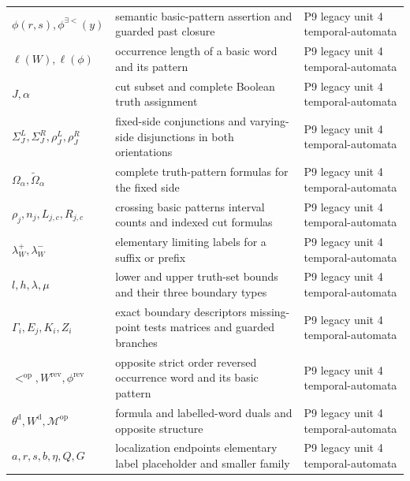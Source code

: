 \begin{longtable}{@{}p{}p{}p{}@{}}
\(\phi(r,\allowbreak s),\allowbreak \phi^{\exists<}(y)\) & semantic basic-pattern assertion and guarded past closure & P9 legacy unit 4 temporal-\allowbreak{}automata \\
\(\ell(W),\allowbreak \ell(\phi)\) & occurrence length of a basic word and its pattern & P9 legacy unit 4 temporal-\allowbreak{}automata \\
\(J,\allowbreak \alpha\) & cut subset and complete Boolean truth assignment & P9 legacy unit 4 temporal-\allowbreak{}automata \\
\(\Sigma_J^L,\allowbreak \Sigma_J^R,\allowbreak \rho_J^L,\allowbreak \rho_J^R\) & fixed-side conjunctions and varying-side disjunctions in both orientations & P9 legacy unit 4 temporal-\allowbreak{}automata \\
\(\Omega_\alpha,\allowbreak \widetilde\Omega_\alpha\) & complete truth-pattern formulas for the fixed side & P9 legacy unit 4 temporal-\allowbreak{}automata \\
\(\rho_j,\allowbreak n_j,\allowbreak L_{j,c},\allowbreak R_{j,c}\) & crossing basic patterns interval counts and indexed cut formulas & P9 legacy unit 4 temporal-\allowbreak{}automata \\
\(\lambda_W^+,\allowbreak \lambda_W^-\) & elementary limiting labels for a suffix or prefix & P9 legacy unit 4 temporal-\allowbreak{}automata \\
\(l,\allowbreak h,\allowbreak \lambda,\allowbreak \mu\) & lower and upper truth-set bounds and their three boundary types & P9 legacy unit 4 temporal-\allowbreak{}automata \\
\(\Gamma_i,\allowbreak E_j,\allowbreak K_i,\allowbreak Z_i\) & exact boundary descriptors missing-point tests matrices and guarded branches & P9 legacy unit 4 temporal-\allowbreak{}automata \\
\(<^{\mathrm{op}},\allowbreak W^{\mathrm{rev}},\allowbreak \phi^{\mathrm{rev}}\) & opposite strict order reversed occurrence word and its basic pattern & P9 legacy unit 4 temporal-\allowbreak{}automata \\
\(\theta^{\mathrm d},\allowbreak W^{\mathrm d},\allowbreak \mathcal M^{\mathrm{op}}\) & formula and labelled-word duals and opposite structure & P9 legacy unit 4 temporal-\allowbreak{}automata \\
\(a,\allowbreak r,\allowbreak s,\allowbreak b,\allowbreak \eta,\allowbreak Q,\allowbreak G\) & localization endpoints elementary label placeholder and smaller family & P9 legacy unit 4 temporal-\allowbreak{}automata \\

\end{longtable}
